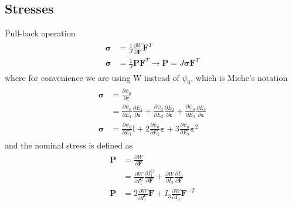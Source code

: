 \documentclass[12pt,3p]{article}
\numberwithin{equation}{section}
\begin{document}
\subsection{Stresses}
Pull-back operation
\begin{align}
\begin{split}
\boldsymbol{\sigma} &= \frac{1}{J} \frac{\partial W}{\partial \mathbf{F}} \mathbf{F}^T  \\
\boldsymbol{\sigma} &= \frac{1}{J} \mathbf{P} \mathbf{F}^T \rightarrow \mathbf{P} = J \boldsymbol{\sigma} \mathbf{F}^{T}
\end{split}
\end{align}
where for convenience we are using W instead of $\psi_0$, which is Miehe's notation
\begin{align}
\begin{split}
\boldsymbol{\sigma} &= \frac{\partial \psi_{0}}{\partial \boldsymbol{\varepsilon}} \\
				&= \frac{\partial \psi_{0}}{\partial E_1} \frac{\partial E_1}{\partial \boldsymbol{\varepsilon}}
				+ \frac{\partial \psi_{0}}{\partial E_2 } \frac{\partial E_2 }{\partial \boldsymbol{\varepsilon}}
				+ \frac{\partial \psi_{0}}{\partial E_3 } \frac{\partial E_3 }{\partial \boldsymbol{\varepsilon}} \\
\boldsymbol{\sigma} &= \frac{\partial \psi_{0}}{\partial E_1} \mathrm{I} 
				+ 2 \frac{\partial \psi_{0}}{\partial E_2 } \boldsymbol{\varepsilon}
				+ 3 \frac{\partial \psi_{0}}{\partial E_3 } \boldsymbol{\varepsilon}^{2}
\end{split}
\end{align}
and the nominal stress is defined as 
\begin{align}
\begin{split}
\mathbf{P} &= \frac{\partial W}{\partial \mathbf{F}} \\
		 &= \frac{\partial W}{\partial I_1^\mathbf{C}} \frac{\partial I_1^\mathbf{C}}{\partial \mathbf{F}} + \frac{\partial W}{\partial I_3} \frac{\partial I_3}{\partial \mathbf{F}} \\
\mathbf{P} &= 2 \frac{\partial W}{\partial I_1^\mathbf{C}} \mathbf{F} + I_3 \frac{\partial W}{\partial I_3} \mathbf{F}^{-T}
\end{split}
\end{align}


\end{document}
